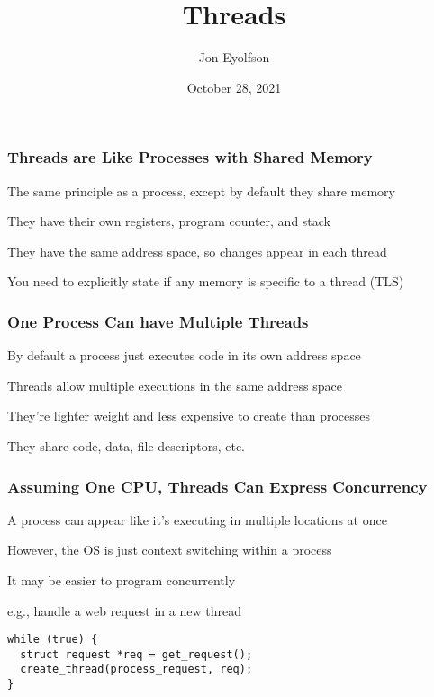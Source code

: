

\title{Threads}
\author{Jon Eyolfson}
\date{October 28, 2021}


  \begin{frame}
    \titlepage
  \end{frame}

  \begin{frame}
    \frametitle{Threads are Like Processes with Shared Memory}

    The same principle as a process, except by default they share memory

    \hspace{2em} They have their own registers, program counter, and stack

    \vspace{2em}

    They have the same address space, so changes appear in each thread

    \vspace{2em}

    You need to explicitly state if any memory is specific to a thread (TLS)
  \end{frame}

  \begin{frame}
    \frametitle{One Process Can have Multiple Threads}

    By default a process just executes code in its own address space

    \vspace{2em}

    Threads allow multiple executions in the same address space

    \vspace{2em}

    They're lighter weight and less expensive to create than processes

    \hspace{2em} They share code, data, file descriptors, etc.
  \end{frame}

  \begin{frame}[fragile]
    \frametitle{Assuming One CPU, Threads Can Express Concurrency}

    A process can appear like it's executing in multiple locations at once

    \hspace{2em} However, the OS is just context switching within a process

    \vspace{2em}

    It may be easier to program concurrently

    \hspace{2em} e.g., handle a web request in a new thread

    \vspace{2em}

    \begin{lstlisting}
while (true) {
  struct request *req = get_request();
  create_thread(process_request, req);
}
    \end{lstlisting}
  \end{frame}

